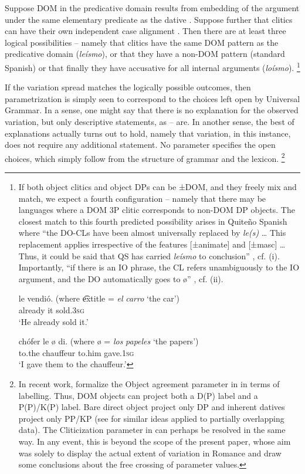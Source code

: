 \documentclass[output=paper,colorlinks,citecolor=brown,nonflat]{./langscibook}
\begin{document}
Suppose DOM in the predicative domain results from embedding of the argument under the same elementary predicate as the dative . Suppose further that clitics can have their own independent case alignment . Then there are at least three logical possibilities – namely that clitics have the same DOM pattern as the predicative domain (\textit{leísmo}), or that they have a non-DOM pattern (standard Spanish) or that finally they have accusative for all internal arguments (\textit{loísmo}).{} \footnote{If both object clitics and object DPs can be ±DOM, and they freely mix and match, we expect a fourth configuration – namely that there may be languages where a DOM 3P clitic corresponds to non-DOM DP objects. The closest match to this fourth predicted possibility arises in Quiteño Spanish where “the DO-CLs have been almost universally replaced by \textit{le(s)} … This replacement applies irrespective of the features [±animate] and [±masc] …Thus, it could be said that QS has carried \textit{leísmo} to conclusion” \citep[387--388]{Suñer1989}, cf. (i). Importantly, “if there is an IO phrase, the CL refers unambiguously to the IO argument, and the DO automatically goes to ø” \citep[389]{Suñer1989}, cf. (ii).

\ea%

     {le}   {vendió}.   \hfill (where \t	extit{le} {=} \textit{el} \textit{carro} ‘the car’)\\
        already   it   sold\textsc{.3sg}\\
    \glt ‘He already sold it.’
\z

\ea%

     {chófer}  {le}   {ø} {di}.   \hfill (where {ø} = \textit{los} \textit{papeles} ‘the papers’)\\
        to.the chauffeur   to.him   {} gave.\textsc{1sg}\\
    \glt ‘I gave them to the chauffeur.’
\z
}

If the variation spread matches the logically possible outcomes, then parametrization is simply seen to correspond to the choices left open by Universal Grammar. In a sense, one might say that there is no explanation for the observed variation, but only descriptive statements, as -- are. In another sense, the best of explanations actually turns out to hold, namely that variation, in this instance, does not require any additional statement. No parameter specifies the open choices, which simply follow from the structure of grammar and the lexicon.{} \footnote{In recent work, \citet{ManziniFranco2019} formalize the Object agreement parameter in  in terms of labelling. Thus, DOM objects can project both a D(P) label and a P(P)/K(P) label. Bare direct object project only DP and inherent datives project only PP/KP (see  for similar ideas applied to partially overlapping data). The Cliticization parameter in  can perhaps be resolved in the same way. In any event, this is beyond the scope of the present paper, whose aim was solely to display the actual extent of variation in Romance and draw some conclusions about the free crossing of parameter values.}
\end{document}
